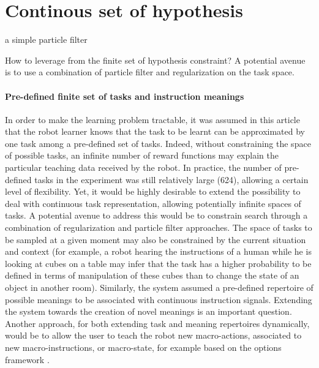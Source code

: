 \section{Continous set of hypothesis}
\label{chapter:limitations:continoushypothesis}

a simple particle filter

How to leverage from the finite set of hypothesis constraint? A potential avenue is to use a combination of particle filter and regularization on the task space.

\paragraph{Pre-defined finite set of tasks and instruction meanings} In order to make the learning problem tractable, it was assumed in this article that the robot learner knows that the task to be learnt can be approximated by one task among a pre-defined set of tasks. Indeed, without constraining the space of possible tasks, an infinite number of reward functions may explain the particular teaching data received by the robot. In practice, the number of pre-defined tasks in the experiment was still relatively large (624), allowing a certain level of flexibility. Yet, it would be highly desirable to extend the possibility to deal with continuous task representation, allowing potentially infinite spaces of tasks. A potential avenue to address this would be to constrain search through a combination of regularization and particle filter approaches. The space of tasks to be sampled at a given moment may also be constrained by the current situation and context (for example, a robot hearing the instructions of a human while he is looking at cubes on a table may infer that the task has a higher probability to be defined in terms of manipulation of these cubes than to change the state of an object in another room). Similarly, the system assumed a pre-defined repertoire of possible meanings to be associated with continuous instruction signals. Extending the system towards the creation of novel meanings is an important question. Another approach, for both extending task and meaning repertoires dynamically, would be to allow the user to teach the robot new macro-actions, associated to new macro-instructions, or macro-state, for example based on the options framework \cite{sutton1999between}.

